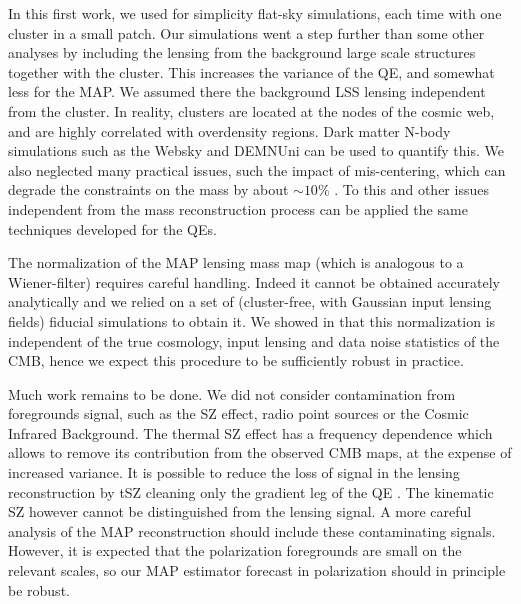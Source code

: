 \documentclass[prd, superscriptaddress, tightenlines, longbibliography, nofootinbib, eqsecnum, amsfonts, amsmath, floatfix, twocolumn, notitlepage]{revtex4-2}
\newcommand{\JC}[1]{\color{purple}{{JC:#1}}\color{black}\xspace}
\newcommand{\LL}[1]{{\color{orange}{LL: #1}}}
\newcommand{\bb}[1]{\textcolor{teal}{SS : #1}}
\begin{document}
In this first work, we used for simplicity flat-sky simulations, each time with one cluster in a small patch. Our simulations went a step further than some other analyses by including the lensing from the background large scale structures together with the cluster. This increases the variance of the QE, and somewhat less for the MAP. We assumed there the background LSS lensing independent from the cluster. In reality, clusters are located at the nodes of the cosmic web, and are highly correlated with overdensity regions. Dark matter N-body simulations such as the Websky \cite{Stein:2020its} and DEMNUni \cite{Carbone:2016nzj} can be used to quantify this. We also neglected many practical issues, such the impact of mis-centering, which can degrade the constraints on the mass by about $\sim 10\%$ \cite{Madhavacheril:2017onh, Zubeldia:2019brr}. To this and other issues independent from the mass reconstruction process can be applied the same techniques developed for the QEs.

The normalization of the MAP lensing mass map (which is analogous to a Wiener-filter) requires careful handling. Indeed it cannot be obtained accurately analytically and we relied on a set of (cluster-free, with Gaussian input lensing fields) fiducial simulations to obtain it. We showed in \cite{Legrand:2021qdu} that this normalization is independent of the true cosmology, input lensing and data noise statistics of the CMB, hence we expect this procedure to be sufficiently robust in practice.

Much work remains to be done. We did not consider contamination from foregrounds signal, such as the SZ effect, radio point sources or the Cosmic Infrared Background. The thermal SZ effect has a frequency dependence which allows to remove its contribution from the observed CMB maps, at the expense of increased variance. It is possible to reduce the loss of signal in the lensing reconstruction by tSZ cleaning only the gradient leg of the QE \cite{Madhavacheril:2018bxi, DES:2018myw, Patil_2020}. The kinematic SZ however cannot be distinguished from the lensing signal. A more careful analysis of the MAP reconstruction should include these contaminating signals. However, it is expected that the polarization foregrounds are small on the relevant scales, so our MAP estimator forecast in polarization should in principle be robust.
\end{document}
